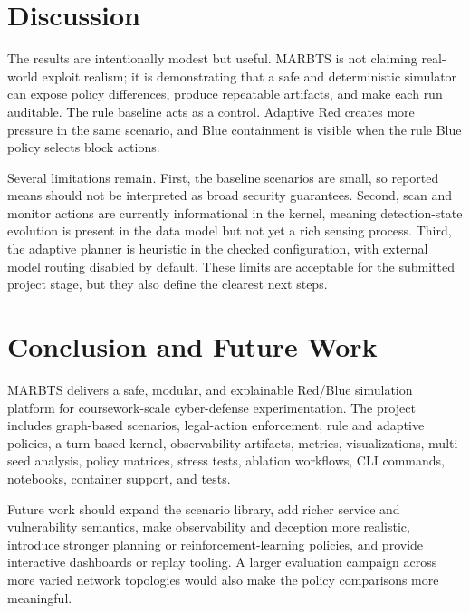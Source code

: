 \documentclass[10pt,twocolumn]{article}
\begin{document}
\section{Discussion}
The results are intentionally modest but useful. MARBTS is not claiming real-world exploit realism; it is demonstrating that a safe and deterministic simulator can expose policy differences, produce repeatable artifacts, and make each run auditable. The rule baseline acts as a control. Adaptive Red creates more pressure in the same scenario, and Blue containment is visible when the rule Blue policy selects block actions.

Several limitations remain. First, the baseline scenarios are small, so reported means should not be interpreted as broad security guarantees. Second, scan and monitor actions are currently informational in the kernel, meaning detection-state evolution is present in the data model but not yet a rich sensing process. Third, the adaptive planner is heuristic in the checked configuration, with external model routing disabled by default. These limits are acceptable for the submitted project stage, but they also define the clearest next steps.

\section{Conclusion and Future Work}
MARBTS delivers a safe, modular, and explainable Red/Blue simulation platform for coursework-scale cyber-defense experimentation. The project includes graph-based scenarios, legal-action enforcement, rule and adaptive policies, a turn-based kernel, observability artifacts, metrics, visualizations, multi-seed analysis, policy matrices, stress tests, ablation workflows, CLI commands, notebooks, container support, and tests.

Future work should expand the scenario library, add richer service and vulnerability semantics, make observability and deception more realistic, introduce stronger planning or reinforcement-learning policies, and provide interactive dashboards or replay tooling. A larger evaluation campaign across more varied network topologies would also make the policy comparisons more meaningful.
\end{document}
